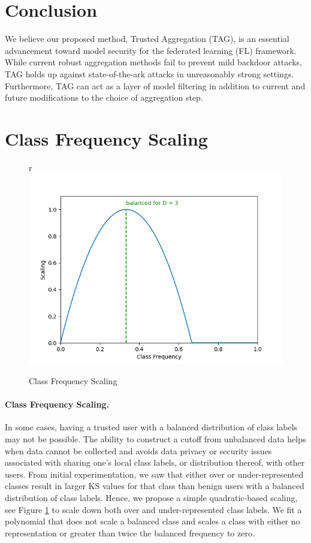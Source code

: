 \documentclass{article} %
\begin{document}
% 
\section{Conclusion}

We believe our proposed method, Trusted Aggregation (TAG), is an essential advancement toward model security for the federated learning (FL) framework. While current robust aggregation methods fail to prevent mild backdoor attacks, TAG holds up against state-of-the-ark attacks in unreasonably strong settings. Furthermore, TAG can act as a layer of model filtering in addition to current and future modifications to the choice of aggregation step.

%







%
\pagebreak
\appendix

%
\section{Class Frequency Scaling}

\begin{figure}{r}
    \centering
    \includegraphics[width=.4\textwidth]{make_article/make_visuals/visuals/scaling.png}
    \caption{Class Frequency Scaling}
    \label{fig:scaling}
\end{figure}

\paragraph{Class Frequency Scaling.} In some cases, having a trusted user with a balanced distribution of class labels may not be possible. The ability to construct a cutoff from unbalanced data helps when data cannot be collected and avoids data privacy or security issues associated with sharing one's local class labels, or distribution thereof, with other users. From initial experimentation, we saw that either over or under-represented classes result in larger KS values for that class than benign users with a balanced distribution of class labels. Hence, we propose a simple quadratic-based scaling, see Figure \ref{fig:scaling} to scale down both over and under-represented class labels. We fit a polynomial that does not scale a balanced class and scales a class with either no representation or greater than twice the balanced frequency to zero.
\end{document}
